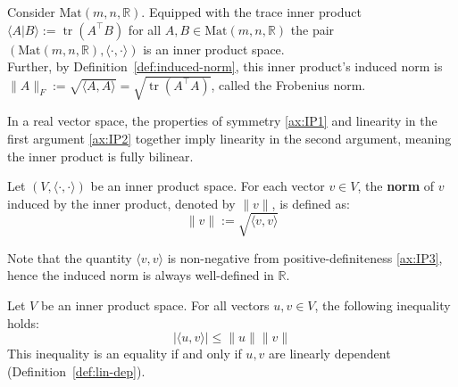 		\begin{example}
			\label{ex:trace-inner-product}
			Consider $\mathrm{Mat}(m, n, \mathbb{R})$. Equipped with the trace inner product $\langle A | B \rangle := \operatorname{tr}(A^\top B)$ for all $A, B \in \mathrm{Mat}(m, n, \mathbb{R})$ the pair $(\mathrm{Mat}(m, n, \mathbb{R}), \langle \cdot, \cdot \rangle)$ is an inner product space. \\
			\indent Further, by Definition~\ref{def:induced-norm}, this inner product's induced norm is $\|A\|_F := \sqrt{\langle A,A\rangle} = \sqrt{\operatorname{tr}(A^\top A)}$, called the Frobenius norm.
		\end{example}
		
		\begin{remark}
			In a real vector space, the properties of symmetry \ref{ax:IP1} and linearity in the first argument \ref{ax:IP2} together imply linearity in the second argument, meaning the inner product is fully bilinear.
		\end{remark} 
		
		\begin{definition} 
			\label{def:induced-norm}
			Let $(V, \langle \cdot, \cdot \rangle)$ be an inner product space. For each vector $v \in V$, the \textbf{norm} of $v$ induced by the inner product, denoted by $\|v\|$, is defined as:
			\[
				\|v\| := \sqrt{\langle v, v \rangle} 
			\]
		\end{definition}
		
		\begin{remark}
			\label{rem:bilinearity}
			Note that the quantity ${\langle v, v \rangle}$ is non-negative from positive-definiteness \ref{ax:IP3}, hence the induced norm is always well-defined in $\mathbb{R}$.
		\end{remark}
		
		\begin{theorem} \label{thm:cauchy-schwarz}
			Let $V$ be an inner product space. For all vectors $u, v \in V$, the following inequality holds:
			\[ 
				|\langle u, v \rangle| \le \|u\| \|v\|
			\]
			This inequality is an equality if and only if $u, v$ are linearly dependent (Definition~\ref{def:lin-dep}).
		\end{theorem}
		
